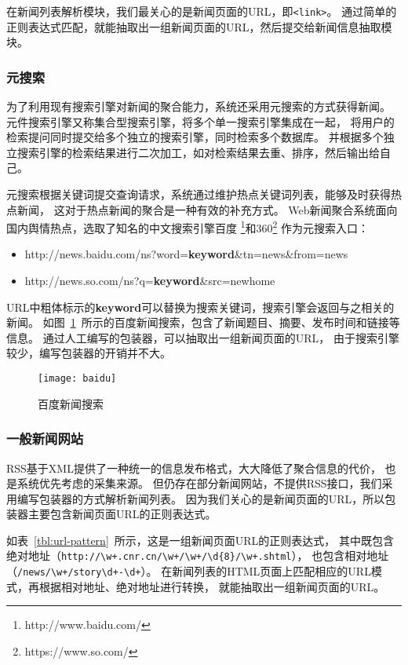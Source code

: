 在新闻列表解析模块，我们最关心的是新闻页面的URL，即\texttt{<link>}。
通过简单的正则表达式匹配，就能抽取出一组新闻页面的URL，然后提交给新闻信息抽取模块。

\subsubsection{元搜索}
为了利用现有搜索引擎对新闻的聚合能力，系统还采用元搜索的方式获得新闻。
元件搜索引擎又称集合型搜索引擎，将多个单一搜索引擎集成在一起，
将用户的检索提问同时提交给多个独立的搜索引擎，同时检索多个数据库。
并根据多个独立搜索引擎的检索结果进行二次加工，如对检索结果去重、排序，然后输出给自己。

元搜索根据关键词提交查询请求，系统通过维护热点关键词列表，能够及时获得热点新闻，
这对于热点新闻的聚合是一种有效的补充方式。
Web新闻聚合系统面向国内舆情热点，选取了知名的中文搜索引擎百度
\footnote{http://www.baidu.com/}和360\footnote{https://www.so.com/}
作为元搜索入口：
\begin{itemize}
\item http://news.baidu.com/ns?word=\textbf{keyword}\&tn=news\&from=news
\item http://news.so.com/ns?q=\textbf{keyword}\&src=newhome
\end{itemize}

URL中粗体标示的\textbf{keyword}可以替换为搜索关键词，搜索引擎会返回与之相关的新闻。
如图~\ref{fig:baidu}~所示的百度新闻搜索，包含了新闻题目、摘要、发布时间和链接等信息。
通过人工编写的包装器，可以抽取出一组新闻页面的URL，
由于搜索引擎较少，编写包装器的开销并不大。

\begin{figure}[htbp]
\centering
\texttt{[image: baidu]}
\caption{百度新闻搜索}
\label{fig:baidu}
\end{figure}

\subsubsection{一般新闻网站}
RSS基于XML提供了一种统一的信息发布格式，大大降低了聚合信息的代价，
也是系统优先考虑的采集来源。
但仍存在部分新闻网站，不提供RSS接口，我们采用编写包装器的方式解析新闻列表。
因为我们关心的是新闻页面的URL，所以包装器主要包含新闻页面URL的正则表达式。

如表~\ref{tbl:url-pattern}~所示，这是一组新闻页面URL的正则表达式，
其中既包含绝对地址（\verb|http://\w+.cnr.cn/\w+/\w+/\d{8}/\w+.shtml|），
也包含相对地址（\verb|/news/\w+/story\d+-\d+|）。
在新闻列表的HTML页面上匹配相应的URL模式，再根据相对地址、绝对地址进行转换，
就能抽取出一组新闻页面的URL。


